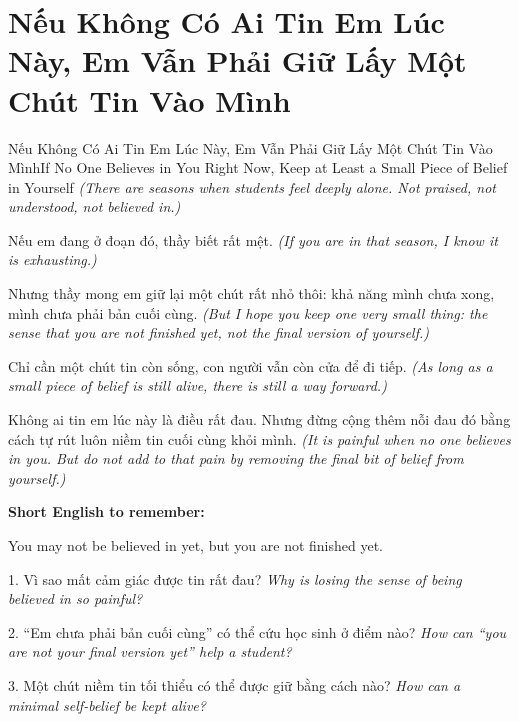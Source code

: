 \section{Nếu Không Có Ai Tin Em Lúc Này, Em Vẫn Phải Giữ Lấy Một Chút Tin Vào Mình}
\begin{truyen}{Nếu Không Có Ai Tin Em Lúc Này, Em Vẫn Phải Giữ Lấy Một Chút Tin Vào Mình}{If No One Believes in You Right Now, Keep at Least a Small Piece of Belief in Yourself}
\textit{(There are seasons when students feel deeply alone. Not praised, not understood, not believed in.)}

Nếu em đang ở đoạn đó, thầy biết rất mệt.
\textit{(If you are in that season, I know it is exhausting.)}

Nhưng thầy mong em giữ lại một chút rất nhỏ thôi: khả năng mình chưa xong, mình chưa phải bản cuối cùng.
\textit{(But I hope you keep one very small thing: the sense that you are not finished yet, not the final version of yourself.)}

Chỉ cần một chút tin còn sống, con người vẫn còn cửa để đi tiếp.
\textit{(As long as a small piece of belief is still alive, there is still a way forward.)}
\end{truyen}

\begin{baihoc}
Không ai tin em lúc này là điều rất đau. Nhưng đừng cộng thêm nỗi đau đó bằng cách tự rút luôn niềm tin cuối cùng khỏi mình.
\textit{(It is painful when no one believes in you. But do not add to that pain by removing the final bit of belief from yourself.)}
\end{baihoc}

\begin{ghinhoanh}
\textbf{Short English to remember:}

You may not be believed in yet, but you are not finished yet.

\end{ghinhoanh}

\begin{tuhocnhanh}
1. Vì sao mất cảm giác được tin rất đau? \textit{Why is losing the sense of being believed in so painful?}

2. “Em chưa phải bản cuối cùng” có thể cứu học sinh ở điểm nào? \textit{How can “you are not your final version yet” help a student?}

3. Một chút niềm tin tối thiểu có thể được giữ bằng cách nào? \textit{How can a minimal self-belief be kept alive?}
\end{tuhocnhanh}
\ngancach

